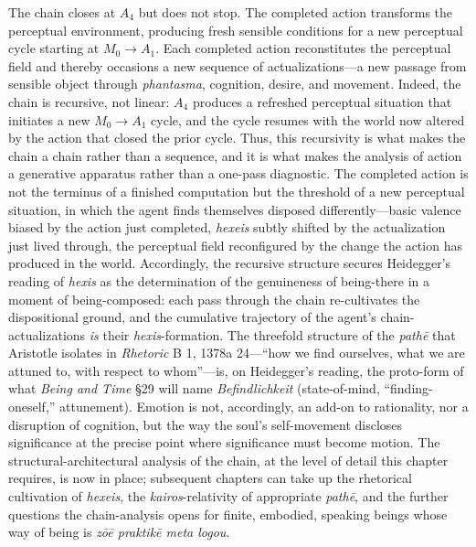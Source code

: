 \documentclass{article}
\newcommand{\gk}[1]{{\greekfont #1}}
\begin{document}
The chain closes at $A_4$ but does not stop. The completed action transforms the perceptual environment, producing fresh sensible conditions for a new perceptual cycle starting at $M_0 \rightarrow A_1$. Each completed action reconstitutes the perceptual field and thereby occasions a new sequence of actualizations---a new passage from sensible object through \textit{phantasma}, cognition, desire, and movement. Indeed, the chain is recursive, not linear: $A_4$ produces a refreshed perceptual situation that initiates a new $M_0 \rightarrow A_1$ cycle, and the cycle resumes with the world now altered by the action that closed the prior cycle. Thus, this recursivity is what makes the chain a chain rather than a sequence, and it is what makes the analysis of action a generative apparatus rather than a one-pass diagnostic. The completed action is not the terminus of a finished computation but the threshold of a new perceptual situation, in which the agent finds themselves disposed differently---basic valence biased by the action just completed, \textit{hexeis} subtly shifted by the actualization just lived through, the perceptual field reconfigured by the change the action has produced in the world. Accordingly, the recursive structure secures Heidegger's reading of \textit{hexis} as the determination of the genuineness of being-there in a moment of being-composed: each pass through the chain re-cultivates the dispositional ground, and the cumulative trajectory of the agent's chain-actualizations \textit{is} their \textit{hexis}-formation. The threefold structure of the \textit{pathē} that Aristotle isolates in \textit{Rhetoric} B 1, 1378a 24---``how we find ourselves, what we are attuned to, with respect to whom''---is, on Heidegger's reading, the proto-form of what \textit{Being and Time} §29 will name \textit{Befindlichkeit} (\gk{state-of-mind}, ``finding-oneself,'' attunement). Emotion is not, accordingly, an add-on to rationality, nor a disruption of cognition, but the way the soul's self-movement discloses significance at the precise point where significance must become motion. The structural-architectural analysis of the chain, at the level of detail this chapter requires, is now in place; subsequent chapters can take up the rhetorical cultivation of \textit{hexeis}, the \textit{kairos}-relativity of appropriate \textit{pathē}, and the further questions the chain-analysis opens for finite, embodied, speaking beings whose way of being is \textit{zōē praktikē meta logou}.
\end{document}
